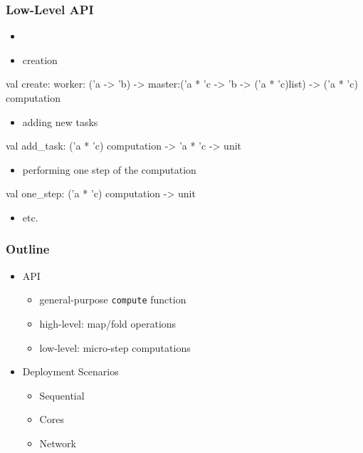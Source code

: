 \documentclass[xcolor=dvipsnames]{beamer}
\let\emph\alert
\begin{document}
\begin{frame}\frametitle {Low-Level API}
\begin{itemize}
\item {}
\item creation
\end{itemize}
  \begin{ocaml}
val create: worker: ('a -> 'b) -> 
              master:('a * 'c -> 'b -> ('a * 'c)list) ->
              ('a * 'c) computation
  \end{ocaml}
  \begin{itemize}
  \item adding new tasks
  \end{itemize}
  \begin{ocaml}
val add_task: ('a * 'c) computation -> 'a * 'c -> unit
  \end{ocaml}
  \begin{itemize}
  \item performing one step of the computation
  \end{itemize}
\begin{ocaml}
val one_step: ('a * 'c) computation -> unit
\end{ocaml}
\begin{itemize}
\item etc.
\end{itemize}
\end{frame}


\begin{frame}\frametitle{Outline}
    \begin{itemize}
    \item API
      \begin{itemize}
      \item general-purpose \texttt{compute} function
      \item high-level: map/fold operations
      \item low-level: micro-step computations
      \end{itemize}


    \item \emph{Deployment Scenarios}
      \begin{itemize}
      \item Sequential
      \item Cores
      \item Network
      \end{itemize}
    \end{itemize}

\end{frame}
  
\end{document}
